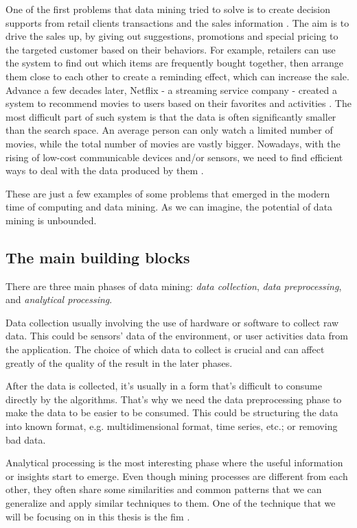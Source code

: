 One of the first problems that data mining tried to solve is to create decision supports from retail clients transactions and the sales information \citep{coenen_datamining_2011}. 
The aim is to drive the sales up, by giving out suggestions, promotions and special pricing to the targeted customer based on their behaviors.
For example, retailers can use the system to find out which items are frequently bought together, then arrange them close to each other to create a reminding effect, which can increase the sale.
Advance a few decades later, Netflix - a streaming service company - created a system to recommend movies to users based on their favorites and activities \citep{netflix_rs_2016}.
The most difficult part of such system is that the data is often significantly smaller than the search space.
An average person can only watch a limited number of movies, while the total number of movies are vastly bigger.
Nowadays, with the rising of low-cost communicable devices and/or sensors, we need to find efficient ways to deal with the data produced by them \citep{data_mining_iot_2014}.

These are just a few examples of some problems that emerged in the modern time of computing and data mining.
As we can imagine, the potential of data mining is unbounded.

\subsection{The main building blocks}
\label{sub:building_blocks}
There are three main phases of data mining: \textit{data collection}, \textit{data preprocessing}, and \textit{analytical processing}.

Data collection usually involving the use of hardware or software to collect raw data.
This could be sensors' data of the environment, or user activities data from the application.
The choice of which data to collect is crucial and can affect greatly of the quality of the result in the later phases.

After the data is collected, it's usually in a form that's difficult to consume directly by the algorithms.
That's why we need the data preprocessing phase to make the data to be easier to be consumed.
This could be structuring the data into known format, e.g. multidimensional format, time series, etc.; or removing bad data.

Analytical processing is the most interesting phase where the useful information or insights start to emerge.
Even though mining processes are different from each other, they often share some similarities and common patterns that we can generalize and apply similar techniques to them.
One of the technique that we will be focusing on in this thesis is the \ac{fim} \citep{borgelt_fim_2012}.


